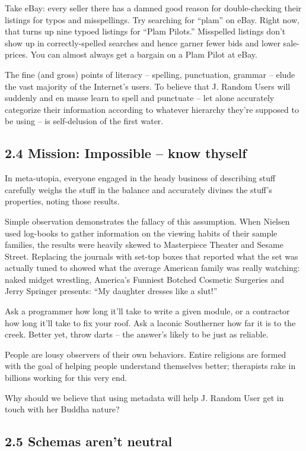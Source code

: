 Take eBay: every seller there has a damned good reason for
double-checking their listings for typos and misspellings. Try
searching for ``plam'' on eBay. Right now, that turns up nine typoed
listings for ``Plam Pilots.'' Misspelled listings don't show up in
correctly-spelled searches and hence garner fewer bids and lower
sale-prices. You can almost always get a bargain on a Plam Pilot at
eBay.

The fine (and gross) points of literacy -- spelling, punctuation,
grammar -- elude the vast majority of the Internet's users. To
believe that J. Random Users will suddenly and en masse learn to
spell and punctuate -- let alone accurately categorize their
information according to whatever hierarchy they're supposed to be
using -- is self-delusion of the first water.

\subsection{2.4 Mission: Impossible -- know thyself}

In meta-utopia, everyone engaged in the heady business of
describing stuff carefully weighs the stuff in the balance and
accurately divines the stuff's properties, noting those results.

Simple observation demonstrates the fallacy of this assumption.
When Nielsen used log-books to gather information on the viewing
habits of their sample families, the results were heavily skewed to
Masterpiece Theater and Sesame Street. Replacing the journals with
set-top boxes that reported what the set was actually tuned to
showed what the average American family was really watching: naked
midget wrestling, America's Funniest Botched Cosmetic Surgeries and
Jerry Springer presents: ``My daughter dresses like a slut!''

Ask a programmer how long it'll take to write a given module, or a
contractor how long it'll take to fix your roof. Ask a laconic
Southerner how far it is to the creek. Better yet, throw darts --
the answer's likely to be just as reliable.

People are lousy observers of their own behaviors. Entire religions
are formed with the goal of helping people understand themselves
better; therapists rake in billions working for this very end.

Why should we believe that using metadata will help J. Random User
get in touch with her Buddha nature?

\subsection{2.5 Schemas aren't neutral}

